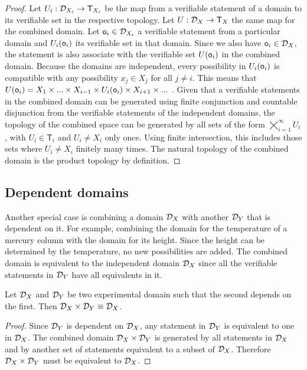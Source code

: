 \documentclass[11pt,letterpaper,fleqn]{memoir} %
\begin{document}
\begin{mathSection}
\begin{proof}
	Let $U_i : \mathcal{D}_{X_i} \to \mathsf{T}_{X_i}$ be the map from a verifiable statement of a domain to its verifiable set in the respective topology. Let $U : \mathcal{D}_{X} \to \mathsf{T}_X$ the same map for the combined domain. Let $\mathsf{o}_i \in \mathcal{D}_{X_i}$ a verifiable statement from a particular domain and $U_i(\mathsf{o}_i)$ its verifiable set in that domain. Since we also have $\mathsf{o}_i \in \mathcal{D}_{X}$, the statement is also associate with the verifiable set $U(\mathsf{o}_i)$ in the combined domain. Because the domains are independent, every possibility in $U_i(\mathsf{o}_i)$ is compatible with any possibility $x_j \in X_j$ for all $j \neq i$. This means that $U(\mathsf{o}_i)=X_1\times ... \times X_{i-1} \times U_i(\mathsf{o}_i) \times X_{i+1} \times ...$ . Given that a verifiable statements in the combined domain can be generated using finite conjunction and countable disjunction from the verifiable statements of the independent domains, the topology of the combined space can be generated by all sets of the form $\bigtimes\limits_{i=1}^{\infty} U_{i}$, with $U_i \in \mathsf{T}_i$ and $U_i \neq X_i$ only once. Using finite intersection, this includes those sets where $U_i \neq X_i$ finitely many times. The natural topology of the combined domain is the product topology by definition.
\end{proof}
\end{mathSection}

\subsection{Dependent domains}

Another special case is combining a domain $\mathcal{D}_X$ with another $\mathcal{D}_Y$ that is dependent on it. For example, combining the domain for the temperature of a mercury column with the domain for its height. Since the height can be determined by the temperature, no new possibilities are added. The combined domain is equivalent to the independent domain $\mathcal{D}_X$ since all the verifiable statements in $\mathcal{D}_Y$ have all equivalents in it.

\begin{mathSection}
	\begin{prop}
		Let $\mathcal{D}_X$ and $\mathcal{D}_Y$ be two experimental domain such that the second depends on the first. Then $\mathcal{D}_X \times \mathcal{D}_Y \equiv \mathcal{D}_X$.
	\end{prop}
	\begin{proof}
		Since $\mathcal{D}_Y$ is dependent on $\mathcal{D}_X$, any statement in $\mathcal{D}_Y$ is equivalent to one in $\mathcal{D}_X$. The combined domain $\mathcal{D}_X \times \mathcal{D}_Y$ is generated by all statements in $\mathcal{D}_X$ and by another set of statements equivalent to a subset of $\mathcal{D}_X$. Therefore $\mathcal{D}_X \times \mathcal{D}_Y$ must be equivalent to $\mathcal{D}_X$. 
	\end{proof}
\end{mathSection}
\end{document}
